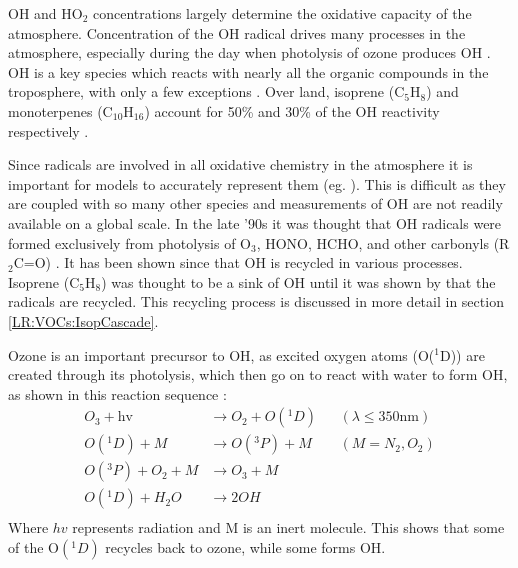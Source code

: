     
    OH and HO$_2$ concentrations largely determine the oxidative capacity of the atmosphere.
    Concentration of the OH radical drives many processes in the atmosphere, especially during the day when photolysis of ozone produces OH \parencite{Atkinson2000}.
    OH is a key species which reacts with nearly all the organic compounds in the troposphere, with only a few exceptions \parencite{Atkinson2000}.
    Over land, isoprene (C$_5$H$_8$) and monoterpenes (C$_{10}$H$_{16}$) account for 50\% and 30\% of the OH reactivity respectively \parencite{Fuentes2000}.
    
    Since radicals are involved in all oxidative chemistry in the atmosphere it is important for models to accurately represent them (eg. \textcite{Travis2014}).
    This is difficult as they are coupled with so many other species and measurements of OH are not readily available on a global scale.
    In the late '90s it was thought that OH radicals were formed exclusively from photolysis of O$_3$, HONO, HCHO, and other carbonyls (R$_2$C=O) \parencite{Atkinson2000}.
    It has been shown since that OH is recycled in various processes.
    Isoprene (C$_5$H$_8$) was thought to be a sink of OH until it was shown by \textcite{Paulot2009b} that the radicals are recycled.
    This recycling process is discussed in more detail in section \ref{LR:VOCs:IsopCascade}.
    
    Ozone is an important precursor to OH, as excited oxygen atoms (O(${}^1$D)) are created through its photolysis, which then go on to react with water to form OH, as shown in this reaction sequence \parencite{Atkinson2000, AtkinsonArey2003}:
    \begin{equation}
      \begin{aligned}
        O_3+\text{hv}     & \to  O_2 + O({}^1D)   && (\lambda \le 350 \text{nm}) \\%
        O({}^1D)+M        & \to  O({}^3P) + M     && (M=N_2, O_2)               \\%
        O({}^3P)+O_2 + M  & \to  O_3 + M          &&                           \\%
        O({}^1D)+H_2O     & \to  2OH              &&                            \\%
      \end{aligned}
      \label{LR:Atmos:Chem:eqn_O3toOH}
    \end{equation}
    Where $hv$ represents radiation and M is an inert molecule.
    This shows that some of the O$({}^1D)$ recycles back to ozone, while some forms OH.
      
